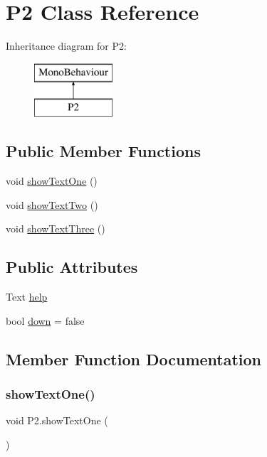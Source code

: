 \hypertarget{class_p2}{}\section{P2 Class Reference}
\label{class_p2}
Inheritance diagram for P2\+:\begin{figure}[H]
\begin{center}
\leavevmode
\includegraphics[height=2.000000cm]{class_p2}
\end{center}
\end{figure}
\subsection*{Public Member Functions}
\begin{DoxyCompactItemize}
\item 
void \hyperlink{class_p2_ab7d360c4594f6a3a449a8bf493f9cf15}{show\+Text\+One} ()
\item 
void \hyperlink{class_p2_a152ef7f6e9de4265caf63cf2a1f70822}{show\+Text\+Two} ()
\item 
void \hyperlink{class_p2_a780ca00a71e17fbe6e5047bdb11c90a4}{show\+Text\+Three} ()
\end{DoxyCompactItemize}
\subsection*{Public Attributes}
\begin{DoxyCompactItemize}
\item 
Text \hyperlink{class_p2_a2a27095e4b32343150d613a13fa0408a}{help}
\item 
bool \hyperlink{class_p2_a78207b72f4528ec324966d7aaa3f8dc9}{down} = false
\end{DoxyCompactItemize}


\subsection{Member Function Documentation}
\mbox{\label{class_p2_ab7d360c4594f6a3a449a8bf493f9cf15}} 
\subsubsection{\texorpdfstring{show\+Text\+One()}{showTextOne()}}
{\footnotesize\ttfamily void P2.\+show\+Text\+One (\begin{DoxyParamCaption}{ }\end{DoxyParamCaption})}

